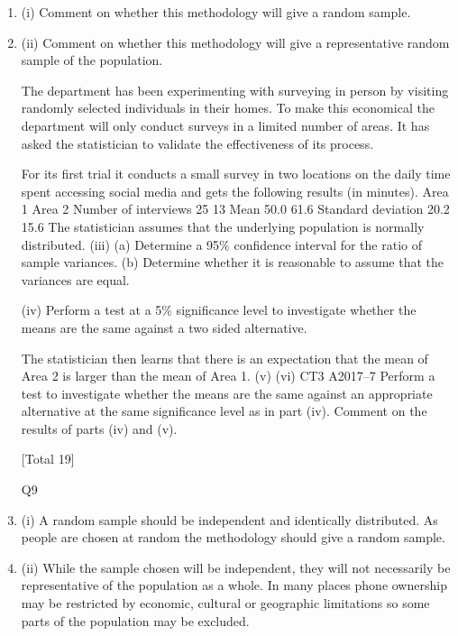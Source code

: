 \documentclass[a4paper,12pt]{article}
\begin{document}
\begin{enumerate}
[Total 20]
9
A statistician is examining the survey methodology of a country’s national statistics department. It conducts much of its data collection by telephoning individuals
selected at random and asking them questions.
\item (i) Comment on whether this methodology will give a random sample.

\item (ii) Comment on whether this methodology will give a representative random
sample of the population.

The department has been experimenting with surveying in person by visiting randomly selected individuals in their homes. To make this economical the
department will only conduct surveys in a limited number of areas. It has asked the
statistician to validate the effectiveness of its process.

For its first trial it conducts a small survey in two locations on the daily time spent accessing social media and gets the following results (in minutes).
Area 1
Area 2
Number of
interviews
25
13
Mean
50.0
61.6
Standard
deviation
20.2
15.6
The statistician assumes that the underlying population is normally distributed.
(iii)
(a) Determine a 95\% confidence interval for the ratio of sample variances.
(b) Determine whether it is reasonable to assume that the variances are
equal.

(iv)
Perform a test at a 5\% significance level to investigate whether the means are
the same against a two sided alternative.

The statistician then learns that there is an expectation that the mean of Area 2 is
larger than the mean of Area 1.
(v)
(vi)
CT3 A2017–7
Perform a test to investigate whether the means are the same against an
appropriate alternative at the same significance level as in part (iv).
Comment on the results of parts (iv) and (v).


[Total 19]

Q9
\item (i) A random sample should be independent and identically distributed. As
people are chosen at random the methodology should give a random sample.

\item (ii) While the sample chosen will be independent, they will not necessarily be
representative of the population as a whole. In many places phone ownership
may be restricted by economic, cultural or geographic limitations so some
parts of the population may be excluded.


\end{enumerate}
\end{document}

